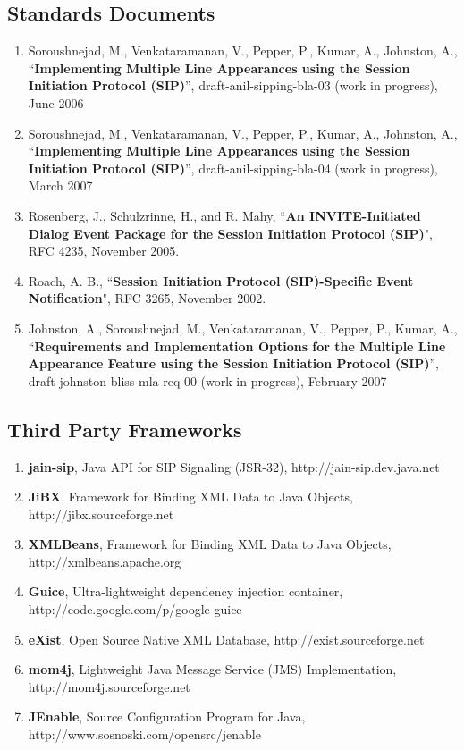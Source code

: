 \documentclass[twoside,11pt]{article}
\newcommand{\bold}[1]{\textbf{#1}}
\begin{document}
\subsection{Standards Documents}
\begin{enumerate}
  \item Soroushnejad, M., Venkataramanan, V., Pepper, P., Kumar, A., Johnston, A.,\\
  ``\bold{Implementing Multiple Line Appearances using the Session
  Initiation Protocol (SIP)}'', draft-anil-sipping-bla-03 (work in progress), June 2006
  \item Soroushnejad, M., Venkataramanan, V., Pepper, P., Kumar, A., Johnston, A.,\\
  ``\bold{Implementing Multiple Line Appearances using the Session
  Initiation Protocol (SIP)}'', draft-anil-sipping-bla-04 (work in progress), March 2007
  \item Rosenberg, J., Schulzrinne, H., and R. Mahy, ``\bold{An INVITE-Initiated
  Dialog Event Package for the Session Initiation Protocol (SIP)}", RFC 4235,
  November 2005.
  \item Roach, A. B., ``\bold{Session Initiation Protocol (SIP)-Specific
  Event Notification}", RFC 3265, November 2002.
  \item Johnston, A., Soroushnejad, M., Venkataramanan, V., Pepper, P., Kumar, A.,\\
  ``\bold{Requirements and Implementation Options for the Multiple Line
  Appearance Feature using the Session Initiation Protocol (SIP)}'',
  draft-johnston-bliss-mla-req-00 (work in progress), February 2007
\end{enumerate}

\subsection{Third Party Frameworks}
\begin{enumerate}
  \item \bold{jain-sip}, Java API for SIP Signaling (JSR-32),
  http://jain-sip.dev.java.net
  \item \bold{JiBX}, Framework for Binding XML Data to Java Objects, http://jibx.sourceforge.net
  \item \bold{XMLBeans}, Framework for Binding XML Data to Java Objects,\\
  http://xmlbeans.apache.org
  \item \bold{Guice}, Ultra-lightweight dependency injection container,
  http://code.google.com/p/google-guice
  \item \bold{eXist}, Open Source Native XML Database, http://exist.sourceforge.net
  \item \bold{mom4j}, Lightweight Java Message Service (JMS) Implementation,\\
  http://mom4j.sourceforge.net
  \item \bold{JEnable}, Source Configuration Program for Java,\\
  http://www.sosnoski.com/opensrc/jenable
\end{enumerate}
\end{document}
